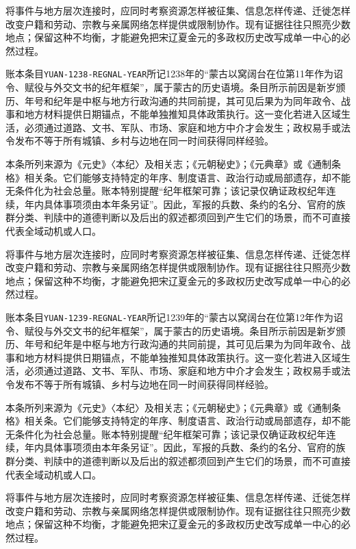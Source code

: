 将事件与地方层次连接时，应同时考察资源怎样被征集、信息怎样传递、迁徙怎样改变户籍和劳动、宗教与亲属网络怎样提供或限制协作。现有证据往往只照亮少数地点；保留这种不均衡，才能避免把宋辽夏金元的多政权历史改写成单一中心的必然过程。

账本条目\texttt{YUAN-1238-REGNAL-YEAR}所记1238年的“蒙古以窝阔台在位第11年作为诏令、赋役与外交文书的纪年框架”，属于蒙古的历史语境。条目所示前因是新岁颁历、年号和纪年是中枢与地方行政沟通的共同前提，其可见后果为为同年政令、战事和地方材料提供日期锚点，不能单独推知具体政策执行。这一变化若进入区域生活，必须通过道路、文书、军队、市场、家庭和地方中介才会发生；政权易手或法令发布不等于所有城镇、乡村与边地在同一时间获得同样经验。

本条所列来源为《元史》〈本纪〉及相关志；《元朝秘史》；《元典章》或《通制条格》相关条。它们能够支持特定的年序、制度语言、政治行动或局部遗存，却不能无条件化为社会总量。账本特别提醒“纪年框架可靠；该记录仅确证政权纪年连续，年内具体事项须由本年条另证”。因此，军报的兵数、条约的名分、官府的族群分类、判牍中的道德判断以及后出的叙述都须回到产生它们的场景，而不可直接代表全域动机或人口。

将事件与地方层次连接时，应同时考察资源怎样被征集、信息怎样传递、迁徙怎样改变户籍和劳动、宗教与亲属网络怎样提供或限制协作。现有证据往往只照亮少数地点；保留这种不均衡，才能避免把宋辽夏金元的多政权历史改写成单一中心的必然过程。

账本条目\texttt{YUAN-1239-REGNAL-YEAR}所记1239年的“蒙古以窝阔台在位第12年作为诏令、赋役与外交文书的纪年框架”，属于蒙古的历史语境。条目所示前因是新岁颁历、年号和纪年是中枢与地方行政沟通的共同前提，其可见后果为为同年政令、战事和地方材料提供日期锚点，不能单独推知具体政策执行。这一变化若进入区域生活，必须通过道路、文书、军队、市场、家庭和地方中介才会发生；政权易手或法令发布不等于所有城镇、乡村与边地在同一时间获得同样经验。

本条所列来源为《元史》〈本纪〉及相关志；《元朝秘史》；《元典章》或《通制条格》相关条。它们能够支持特定的年序、制度语言、政治行动或局部遗存，却不能无条件化为社会总量。账本特别提醒“纪年框架可靠；该记录仅确证政权纪年连续，年内具体事项须由本年条另证”。因此，军报的兵数、条约的名分、官府的族群分类、判牍中的道德判断以及后出的叙述都须回到产生它们的场景，而不可直接代表全域动机或人口。

将事件与地方层次连接时，应同时考察资源怎样被征集、信息怎样传递、迁徙怎样改变户籍和劳动、宗教与亲属网络怎样提供或限制协作。现有证据往往只照亮少数地点；保留这种不均衡，才能避免把宋辽夏金元的多政权历史改写成单一中心的必然过程。
